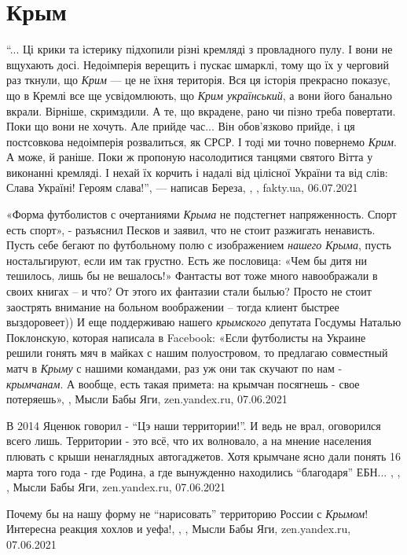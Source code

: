  
 
 
 
 
\chapter{Крым}

\enquote{... Ці крики та істерику підхопили різні кремляді з провладного пулу. І вони не
вщухають досі. Недоімперія верещить і пускає шмарклі, тому що їх у черговий раз
ткнули, що \emph{Крим} — це не їхня територія. Вся ця історія прекрасно показує, що в
Кремлі все ще усвідомлюють, що \emph{Крим український}, а вони його банально вкрали.
Вірніше, скримздили. А те, що вкрадене, рано чи пізно треба повертати. Поки що
вони не хочуть. Але прийде час... Він обов'язково прийде, і ця постсовкова
недоімперія розвалиться, як СРСР. І тоді ми точно повернемо \emph{Крим}. А може, й
раніше. Поки ж пропоную насолодитися танцями святого Вітта у виконанні
кремляді. І нехай їх корчить і надалі від цілісної України та від слів: Слава
Україні! Героям слава!}, — написав Береза,
, , fakty.ua, 06.07.2021

«Форма футболистов с очертаниями \emph{Крыма} не подстегнет напряженность.
Спорт есть спорт», - разъяснил Песков и заявил, что не стоит разжигать
ненависть.  Пусть себе бегают по футбольному полю с изображением \emph{нашего
Крыма}, пусть ностальгируют, если им так грустно. Есть же пословица: «Чем бы
дитя ни тешилось, лишь бы не вешалось!» Фантасты вот тоже много навоображали в
своих книгах – и что? От этого их фантазии стали былью? Просто не стоит
заострять внимание на больном воображении – тогда клиент быстрее выздоровеет))
И еще поддерживаю нашего \emph{крымского} депутата Госдумы Наталью Поклонскую,
которая написала в Facebook: «Если футболисты на Украине решили гонять мяч в
майках с нашим полуостровом, то предлагаю совместный матч в \emph{Крыму} с
нашими командами, раз уж они так скучают по нам - \emph{крымчанам}. А вообще,
есть такая примета: на крымчан посягнешь - свое потеряешь»,
, Мысли Бабы Яги, zen.yandex.ru, 07.06.2021

В 2014 Яценюк говорил - \enquote{Цэ наши территории!}. И ведь не врал,
оговорился всего лишь. Территории - это всё, что их волновало, а на мнение
населения плювать с крыши ненаглядных автогаджетов. Хотя крымчане ясно дали
понять 16 марта того года - где Родина, а где вынужденно находились
\enquote{благодаря} ЕБН... ,
,
, Мысли Бабы Яги, zen.yandex.ru, 07.06.2021

Почему бы на нашу форму не \enquote{нарисовать} территорию России с \emph{Крымом}! Интересна реакция хохлов и уефа!,
,
, Мысли Бабы Яги, zen.yandex.ru, 07.06.2021

